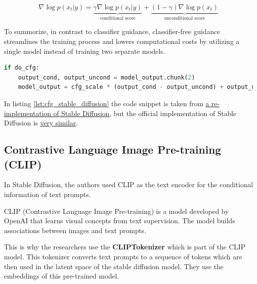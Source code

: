 \[
\nabla \log p(x_t | y) = \underbrace{\gamma \nabla \log p(x_t | y)}_{\text{conditional score}} + \underbrace{(1 - \gamma) \nabla \log p(x_t)}_{\text{unconditional score}}
\]

To summorize, in contrast to classifier guidance, classifier-free guidance streamlines the training process and lowers computational costs by utilizing a single model instead of training two separate models.

\begin{lstlisting}[language=Python, caption={Classifier-free guidance (CFG) in Stable Diffusion. The CFG scale is the weight of the conditioning signal.}, label={lst:cfg_stable_diffusion}]
if do_cfg:
    output_cond, output_uncond = model_output.chunk(2)
    model_output = cfg_scale * (output_cond - output_uncond) + output_uncond
\end{lstlisting}

In listing \ref{lst:cfg_stable_diffusion} the code snippet is taken from \href{https://github.com/hkproj/pytorch-stable-diffusion/blob/e0cb06de011787cdf13eed7b4287ad8410491149/sd/pipeline.py#L135C1-L136C1}{a re-implementation of Stable Diffusion}, but the official implementation of Stable Diffusion is \href{https://github.com/CompVis/stable-diffusion/blob/21f890f9da3cfbeaba8e2ac3c425ee9e998d5229/ldm/models/diffusion/ddim.py#L178C1-L179C1}{very similar}.

















\subsection{Contrastive Language Image Pre-training (CLIP)}

\label{subsec:clip}

In Stable Diffusion, the authors used CLIP as the text encoder for the conditional information of text prompts.

CLIP (Contrastive Language Image Pre-training) \cite{openai_clip} is a model developed by OpenAI that learns visual concepts from text supervision. The model builds associations between images and text prompts. 

This is why the researchers use the \textbf{CLIPTokenizer} which is part of the CLIP model. This tokenizer converts text prompts to a sequence of tokens which are then used in the latent space of the stable diffusion model. They use the embeddings of this pre-trained model.

